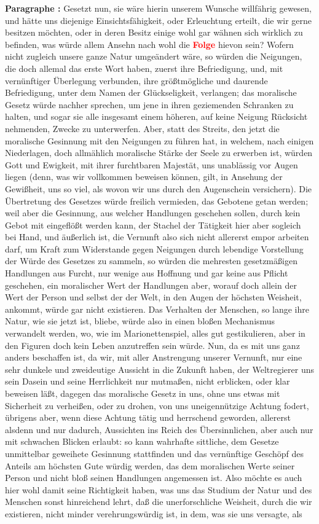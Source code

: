 \documentclass[a4paper,12pt,twoside]{book}
\newcommand{\match}[1]{\textcolor{red}{\textbf{#1}}}
\begin{document}
	\noindent\textbf{Paragraphe : }Gesetzt nun, sie wäre hierin unserem Wunsche willfährig gewesen, und hätte uns diejenige Einsichtsfähigkeit, oder Erleuchtung erteilt, die wir gerne besitzen möchten, oder in deren Besitz einige wohl gar wähnen sich wirklich zu befinden, was würde allem Ansehn nach wohl die \match{Folge} hievon sein? Wofern nicht zugleich unsere ganze Natur umgeändert wäre, so würden die Neigungen, die doch allemal das erste Wort haben, zuerst ihre Befriedigung, und, mit vernünftiger Überlegung verbunden, ihre größtmögliche und daurende Befriedigung, unter dem Namen der Glückseligkeit, verlangen; das moralische Gesetz würde nachher sprechen, um jene in ihren geziemenden Schranken zu halten, und sogar sie alle insgesamt einem höheren, auf keine Neigung Rücksicht nehmenden, Zwecke zu unterwerfen.  Aber, statt des Streits, den jetzt die moralische Gesinnung mit den Neigungen zu führen hat, in welchem, nach einigen Niederlagen, doch allmählich moralische Stärke der Seele zu erwerben ist, würden Gott und Ewigkeit, mit ihrer furchtbaren Majestät, uns unablässig vor Augen liegen (denn, was wir vollkommen beweisen können, gilt, in Ansehung der Gewißheit, uns so viel, als wovon wir uns durch den Augenschein versichern). Die Übertretung des Gesetzes würde freilich vermieden, das Gebotene getan werden; weil aber die Gesinnung, aus welcher Handlungen geschehen sollen, durch kein Gebot mit eingeflößt werden kann, der Stachel der Tätigkeit hier aber sogleich bei Hand, und äußerlich ist, die Vernunft also sich nicht allererst empor arbeiten darf, um Kraft zum Widerstande gegen Neigungen durch lebendige Vorstellung der Würde des Gesetzes zu sammeln, so würden die mehresten gesetzmäßigen Handlungen aus Furcht, nur wenige aus Hoffnung und gar keine aus Pflicht geschehen, ein moralischer Wert der Handlungen aber, worauf doch allein der Wert der Person und selbst der der Welt, in den Augen der höchsten Weisheit, ankommt, würde gar nicht existieren. Das Verhalten der Menschen, so lange ihre Natur, wie sie jetzt ist, bliebe, würde also in einen bloßen Mechanismus verwandelt werden, wo, wie im Marionettenspiel, alles gut gestikulieren, aber in den Figuren doch kein Leben anzutreffen sein würde. Nun, da es mit uns ganz anders beschaffen ist, da wir, mit aller Anstrengung unserer Vernunft, nur eine sehr dunkele und zweideutige Aussicht in die Zukunft haben, der Weltregierer uns sein Dasein und seine Herrlichkeit nur mutmaßen, nicht erblicken, oder klar beweisen läßt, dagegen das moralische Gesetz in uns, ohne uns etwas mit Sicherheit zu verheißen, oder zu drohen, von uns uneigennützige Achtung fodert, übrigens aber, wenn diese Achtung tätig und herrschend geworden, allererst alsdenn und nur dadurch, Aussichten ins Reich des Übersinnlichen, aber auch nur mit schwachen Blicken erlaubt: so kann wahrhafte sittliche, dem Gesetze unmittelbar geweihete Gesinnung stattfinden und das vernünftige Geschöpf des Anteils am höchsten Gute würdig  werden, das dem moralischen Werte seiner Person und nicht bloß seinen Handlungen angemessen ist. Also möchte es auch hier wohl damit seine Richtigkeit haben, was uns das Studium der Natur und des Menschen sonst hinreichend lehrt, daß die unerforschliche Weisheit, durch die wir existieren, nicht minder verehrungswürdig ist, in dem, was sie uns versagte, als 
\end{document}
